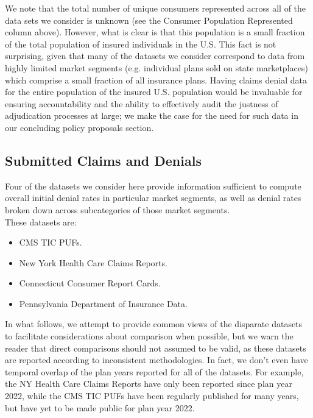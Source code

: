 \documentclass[12pt, a4paper,twoside]{report}
\theoremstyle{plain} %
\theoremstyle{definition} %
\theoremstyle{remark} %
\numberwithin{equation}{chapter}
\begin{document}
		We note that the total number of unique consumers represented across all of the data sets we consider is unknown (see the Consumer Population Represented column above). However, what is clear is that this population is a small fraction of the total population of insured individuals in the U.S. This fact is not surprising, given that many of the datasets we consider correspond to data from highly limited market segments (e.g. individual plans sold on state marketplaces) which comprise a small fraction of all insurance plans. Having claims denial data for the entire population of the insured U.S. population would be invaluable for ensuring accountability and the ability to effectively audit the justness of adjudication processes at large; we make the case for the need for such data in our concluding policy proposals section.\\
		
		\subsection{Submitted Claims and Denials}\label{publicdata:claimsanddenials}
		
		Four of the datasets we consider here provide information sufficient to compute overall initial denial rates in particular market segments, as well as denial rates broken down across subcategories of those market segments.\\
		
		These datasets are:
		
		\begin{itemize}
			\item CMS TIC PUFs.
			\item New York Health Care Claims Reports.
			\item Connecticut Consumer Report Cards.
			\item Pennsylvania Department of Insurance Data.
		\end{itemize}
		
		In what follows, we attempt to provide common views of the disparate datasets to facilitate considerations about comparison when possible, but we warn the reader that direct comparisons should not assumed to be valid, as these datasets are reported according to inconsistent methodologies. In fact, we don't even have temporal overlap of the plan years reported for all of the datasets. For example, the NY Health Care Claims Reports have only been reported since plan year 2022, while the CMS TIC PUFs have been regularly published for many years, but have yet to be made public for plan year 2022.
		
\end{document}
